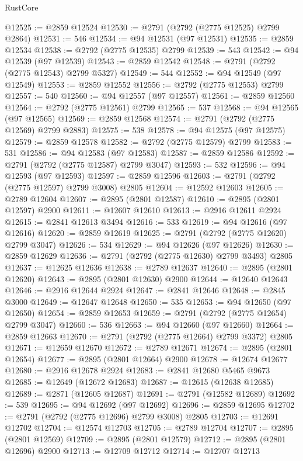 \begin{lexlean}{RustCore}
\begin{coremodule}
@12525 := @2859 @12524
@12530 := @2791 (@2792 (@2775 @12525) @2799 @2864)
@12531 := 546
@12534 := @94 @12531 (@97 @12531)
@12535 := @2859 @12534
@12538 := @2792 (@2775 @12535) @2799
@12539 := 543
@12542 := @94 @12539 (@97 @12539)
@12543 := @2859 @12542
@12548 := @2791 (@2792 (@2775 @12543) @2799 @5327)
@12549 := 544
@12552 := @94 @12549 (@97 @12549)
@12553 := @2859 @12552
@12556 := @2792 (@2775 @12553) @2799
@12557 := 540
@12560 := @94 @12557 (@97 @12557)
@12561 := @2859 @12560
@12564 := @2792 (@2775 @12561) @2799
@12565 := 537
@12568 := @94 @12565 (@97 @12565)
@12569 := @2859 @12568
@12574 := @2791 (@2792 (@2775 @12569) @2799 @2883)
@12575 := 538
@12578 := @94 @12575 (@97 @12575)
@12579 := @2859 @12578
@12582 := @2792 (@2775 @12579) @2799
@12583 := 531
@12586 := @94 @12583 (@97 @12583)
@12587 := @2859 @12586
@12592 := @2791 (@2792 (@2775 @12587) @2799 @3047)
@12593 := 532
@12596 := @94 @12593 (@97 @12593)
@12597 := @2859 @12596
@12603 := @2791 (@2792 (@2775 @12597) @2799 @3008) @2805
@12604 := @12592 @12603
@12605 := @2789 @12604
@12607 := @2895 (@2801 @12587)
@12610 := @2895 (@2801 @12597) @2900
@12611 := @12607 @12610
@12613 := @2916 @12611 @2924
@12615 := @2841 @12613 @3494
@12616 := 533
@12619 := @94 @12616 (@97 @12616)
@12620 := @2859 @12619
@12625 := @2791 (@2792 (@2775 @12620) @2799 @3047)
@12626 := 534
@12629 := @94 @12626 (@97 @12626)
@12630 := @2859 @12629
@12636 := @2791 (@2792 (@2775 @12630) @2799 @3493) @2805
@12637 := @12625 @12636
@12638 := @2789 @12637
@12640 := @2895 (@2801 @12620)
@12643 := @2895 (@2801 @12630) @2900
@12644 := @12640 @12643
@12646 := @2916 @12644 @2924
@12647 := @2841 @12646
@12648 := @2845 @3000
@12649 := @12647 @12648
@12650 := 535
@12653 := @94 @12650 (@97 @12650)
@12654 := @2859 @12653
@12659 := @2791 (@2792 (@2775 @12654) @2799 @3047)
@12660 := 536
@12663 := @94 @12660 (@97 @12660)
@12664 := @2859 @12663
@12670 := @2791 (@2792 (@2775 @12664) @2799 @3372) @2805
@12671 := @12659 @12670
@12672 := @2789 @12671
@12674 := @2895 (@2801 @12654)
@12677 := @2895 (@2801 @12664) @2900
@12678 := @12674 @12677
@12680 := @2916 @12678 @2924
@12683 := @2841 @12680 @5465 @9673
@12685 := @12649 (@12672 @12683)
@12687 := @12615 (@12638 @12685)
@12689 := @2871 (@12605 @12687)
@12691 := @2791 (@12582 @12689)
@12692 := 539
@12695 := @94 @12692 (@97 @12692)
@12696 := @2859 @12695
@12702 := @2791 (@2792 (@2775 @12696) @2799 @3008) @2805
@12703 := @12691 @12702
@12704 := @12574 @12703
@12705 := @2789 @12704
@12707 := @2895 (@2801 @12569)
@12709 := @2895 (@2801 @12579)
@12712 := @2895 (@2801 @12696) @2900
@12713 := @12709 @12712
@12714 := @12707 @12713

\end{coremodule}
\end{lexlean}
